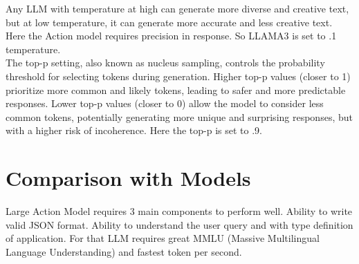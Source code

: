 \noindent Any LLM with temperature at high can generate more diverse and creative text, but at low temperature, it can generate more accurate and less creative text. Here the Action model requires precision in response. So LLAMA3 is set to .1 temperature.\\

\noindent The top-p setting, also known as nucleus sampling, controls the probability threshold for selecting tokens during generation. Higher top-p values (closer to 1) prioritize more common and likely tokens, leading to safer and more predictable responses. Lower top-p values (closer to 0) allow the model to consider less common tokens, potentially generating more unique and surprising responses, but with a higher risk of incoherence. Here the top-p is set to .9.\\


\section{Comparison with Models}

\noindent Large Action Model requires 3 main components to perform well. Ability to write valid JSON format. Ability to understand the user query and with type definition of application. For that LLM requires great MMLU (Massive Multilingual Language Understanding) and fastest token per second.\\



